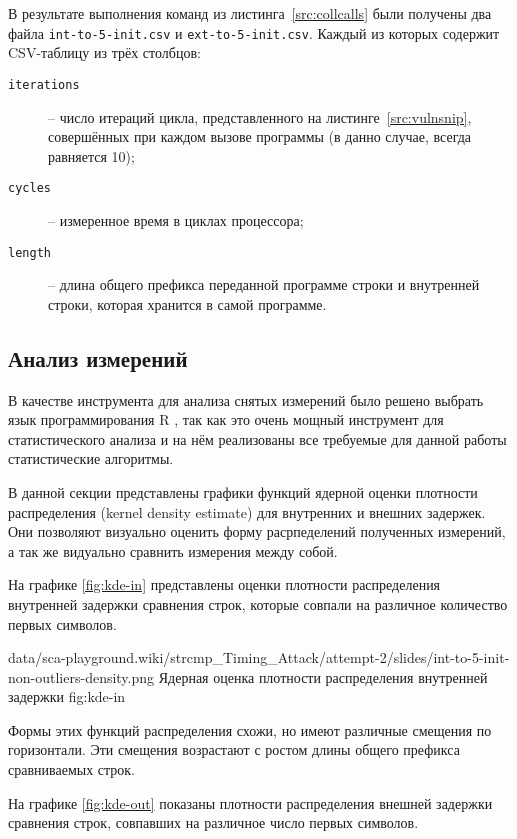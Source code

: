 В результате выполнения команд из листинга~\ref{src:collcalls} были получены два файла
\texttt{int-to-5-init.csv} и \texttt{ext-to-5-init.csv}. Каждый из которых содержит CSV-таблицу
из трёх столбцов:

\begin{description}
\item [\texttt{iterations}] -- число итераций цикла, представленного на
  листинге~\ref{src:vulnsnip}, совершённых при каждом вызове программы 
  (в данно случае, всегда равняется 10);
\item [\texttt{cycles}] -- измеренное время в циклах процессора;
\item [\texttt{length}] -- длина общего префикса переданной программе  строки и
  внутренней строки, которая хранится в самой программе.
\end{description}

\subsection{Анализ измерений}

В качестве инструмента для анализа снятых измерений было решено выбрать язык программирования
R \cite{r}, так как это очень мощный инструмент для статистического анализа и на нём реализованы
все требуемые для данной работы статистические алгоритмы.

В данной секции представлены графики функций ядерной оценки плотности
распределения (kernel density estimate) для внутренних и внешних задержек.
Они позволяют визуально оценить форму расрпеделений полученных измерений, а так же
видуально сравнить измерения между собой.

На графике \ref{fig:kde-in} представлены оценки плотности распределения
внутренней задержки сравнения строк, которые совпали на различное количество
первых символов.

\nopagebreak

\addimghere
{data/sca-playground.wiki/strcmp_Timing_Attack/attempt-2/slides/int-to-5-init-non-outliers-density.png}{}
{Ядерная оценка плотности распределения внутренней задержки}
{fig:kde-in}

Формы этих функций распределения схожи, но имеют различные
смещения по горизонтали. Эти смещения возрастают с ростом длины общего префикса
сравниваемых строк.

На графике \ref{fig:kde-out} показаны плотности распределения внешней задержки
сравнения строк, совпавших на различное число первых символов.

